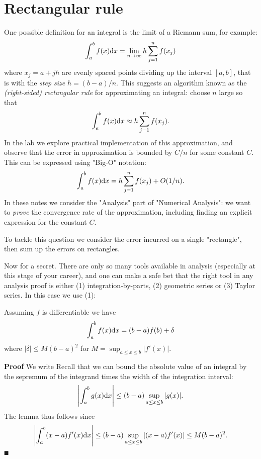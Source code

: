
\section{Rectangular rule}
One possible definition for an integral is the limit of a Riemann sum, for example:
\[
  \ensuremath{\int}_a^b f(x) {\rm d}x = \lim_{n \ensuremath{\rightarrow} \ensuremath{\infty}} h \ensuremath{\sum}_{j=1}^n f(x_j)
\]
where $x_j = a+jh$ are evenly spaced points dividing up the interval $[a,b]$, that is  with the \emph{step size} $h = (b-a)/n$. This suggests an algorithm known as the \emph{(right-sided) rectangular rule} for approximating an integral: choose $n$ large so that
\[
  \ensuremath{\int}_a^b f(x) {\rm d}x \ensuremath{\approx} h \ensuremath{\sum}_{j=1}^n f(x_j).
\]
In the lab we explore practical implementation of this approximation, and observe that the error in approximation is bounded by $C/n$ for some constant $C$. This can be expressed using "Big-O" notation:
\[
\ensuremath{\int}_a^b f(x) {\rm d}x = h \ensuremath{\sum}_{j=1}^n f(x_j) + O(1/n).
\]
In these notes we consider the "Analysis" part of "Numerical Analysis": we want to \emph{prove} the convergence rate of the approximation, including finding an explicit expression for the constant $C$.

To tackle this question we consider the error incurred on a single "rectangle", then sum up the errors on rectangles.

Now for a secret. There are only so many tools available in analysis (especially at this stage of your career), and one can make a safe bet that the right tool in any analysis proof is either (1) integration-by-parts, (2) geometric series or (3) Taylor series. In this case we use (1):

\begin{lemma} Assuming $f$ is differentiable we have
\[
\ensuremath{\int}_a^b f(x) {\rm d}x = (b-a) f(b) + \ensuremath{\delta}
\]
where $|\ensuremath{\delta}| \ensuremath{\leq} M (b-a)^2$ for $M = \sup_{a \ensuremath{\leq} x \ensuremath{\leq} b}|f'(x)|$.

\end{lemma}
\textbf{Proof} We write
Recall that we can bound the absolute value of an integral by the sepremum of the integrand times the width of the integration interval:
\[
\left|{\int_a^b g(x) {\rm d} x}\right| \leq (b-a) \sup_{a \leq x \leq b}|g(x)|.
\]
The lemma thus follows since
\[
\left|{\int_a^b (x-a) f'(x) {\rm d} x}\right| \leq (b-a) \sup_{a \leq x \leq b}|(x-a) f'(x)| \leq M (b-a)^2.
\]
\ensuremath{\QED}

